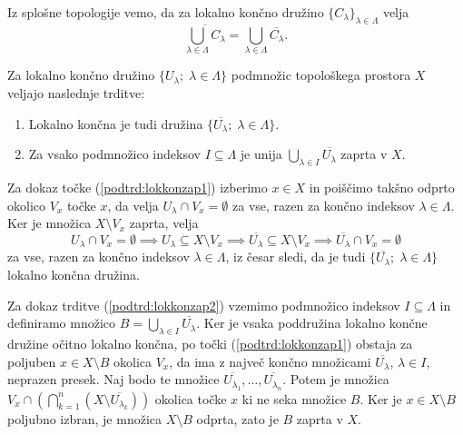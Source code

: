 \documentclass[mat1]{fmfdelo}
\newcommand{\closure}[1]{\overline{#1}}
\begin{document}
\begin{opomba}\label{opo:lokkon} %
Iz splošne topologije vemo, da za lokalno končno družino $\lbrace C_\lambda \rbrace_{\lambda \in \Lambda}$ velja
\[ \closure{\bigcup_{\lambda \in \Lambda} C_\lambda} = \bigcup_{\lambda \in \Lambda} \closure{C_\lambda}. \]
\end{opomba}

\begin{trditev}\label{trd:lokkonzap}
Za lokalno končno družino $\lbrace U_\lambda ;\; \lambda \in \Lambda \rbrace$ podmnožic topološkega prostora $X$ veljajo naslednje trditve:
\begin{enumerate} 
\item Lokalno končna je tudi družina $\lbrace \closure{U_\lambda} ;\; \lambda \in \Lambda \rbrace$.\label{podtrd:lokkonzap1}
\item Za vsako podmnožico indeksov $I \subseteq \Lambda$ je unija $\bigcup_{\lambda \in I}\closure{U_\lambda}$ zaprta v $X$.\label{podtrd:lokkonzap2}
\end{enumerate}
\end{trditev}

\begin{dokaz}
Za dokaz točke (\ref{podtrd:lokkonzap1}) izberimo $x \in X$ in poiščimo takšno odprto okolico $V_x$ točke $x$, da velja $U_\lambda \cap V_x = \emptyset$ za vse, razen za končno indeksov $\lambda \in \Lambda$. Ker je množica $X \setminus V_x$ zaprta, velja
\[ U_\lambda \cap V_x = \emptyset \implies U_\lambda \subseteq X \setminus V_x \implies \closure{U_\lambda} \subseteq X \setminus V_x \implies \closure{U_\lambda} \cap V_x = \emptyset \]
za vse, razen za končno indeksov $\lambda \in \Lambda$, iz česar sledi, da je tudi $\lbrace \closure{U_\lambda} ;\; \lambda \in \Lambda \rbrace$ lokalno končna družina.

Za dokaz trditve (\ref{podtrd:lokkonzap2}) vzemimo podmnožico indeksov $I \subseteq \Lambda$ in definiramo množico $B = \bigcup_{\lambda \in I}\closure{U_\lambda}$. Ker je vsaka poddružina lokalno končne družine očitno lokalno končna, po točki (\ref{podtrd:lokkonzap1}) obstaja za poljuben $x \in X \setminus B$ okolica $V_x$, da ima z največ končno množicami $\closure{U_\lambda}$, $\lambda \in I$, neprazen presek. Naj bodo te množice $\closure{U_{\lambda_1}},\dots,\closure{U_{\lambda_n}}$. Potem je množica $V_x \cap (\bigcap_{k=1}^n(X \setminus \closure{U_{\lambda_k}}))$ okolica točke $x$ ki ne seka množice $B$. Ker je $x \in X \setminus B$ poljubno izbran, je množica $X \setminus B$ odprta, zato je $B$ zaprta v $X$.
\end{dokaz}
\end{document}
